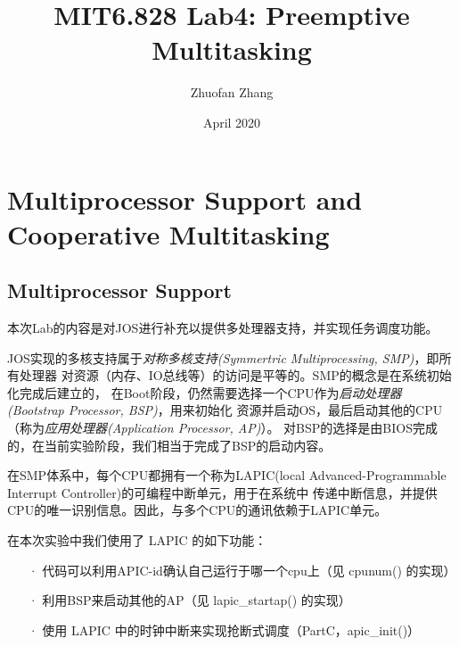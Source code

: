 \documentclass[12pt, letterpaper]{report}
\title{MIT6.828 Lab4: Preemptive Multitasking}
\author{Zhuofan Zhang}
\date{April 2020}
\begin{document}
\maketitle
\renewcommand\contentsname{\Huge Contents}
\tableofcontents{}

\newpage
{}

\chapter[\Large Multiprocessor Support and Cooperative Multitasking]{Multiprocessor Support and Cooperative Multitasking}
\section[\large Multiprocessor Support]{Multiprocessor Support}
本次Lab的内容是对JOS进行补充以提供多处理器支持，并实现任务调度功能。\par

JOS实现的多核支持属于\textsl{对称多核支持(Symmertric Multiprocessing, SMP)}，即所有处理器
对资源（内存、IO总线等）的访问是平等的。SMP的概念是在系统初始化完成后建立的，
在Boot阶段，仍然需要选择一个CPU作为\textsl{启动处理器(Bootstrap Processor, BSP)}，用来初始化
资源并启动OS，最后启动其他的CPU（称为\textsl{应用处理器(Application Processor, AP)}）。
对BSP的选择是由BIOS完成的，在当前实验阶段，我们相当于完成了BSP的启动内容。\par 

在SMP体系中，每个CPU都拥有一个称为LAPIC(local Advanced-Programmable Interrupt Controller)的可编程中断单元，用于在系统中
传递中断信息，并提供CPU的唯一识别信息。因此，与多个CPU的通讯依赖于LAPIC单元。 \par

在本次实验中我们使用了 LAPIC 的如下功能：
\begin{itemize}
    \item[·]
    代码可以利用APIC-id确认自己运行于哪一个cpu上（见 cpunum() 的实现）
    \item[·]
    利用BSP来启动其他的AP（见 lapic\_startap() 的实现）
    \item[·]
    使用 LAPIC 中的时钟中断来实现抢断式调度（PartC，apic\_init()）
\end{itemize}
\end{document}
